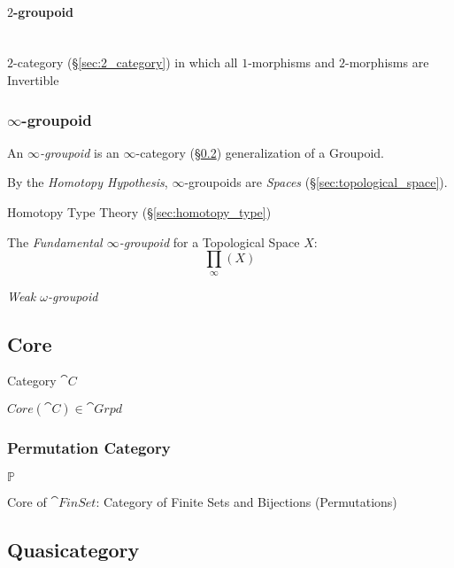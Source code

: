 \paragraph{$2$-groupoid}\label{sec:2_groupoid}
\hfill \\

$2$-category (\S\ref{sec:2_category}) in which all $1$-morphisms and
$2$-morphisms are Invertible



\subsubsection{$\infty$-groupoid}\label{sec:infinity_groupoid}

An \emph{$\infty$-groupoid} is an $\infty$-category
(\S\ref{sec:quasicategory}) generalization of a Groupoid.

By the \emph{Homotopy Hypothesis}, $\infty$-groupoids are \emph{Spaces}
(\S\ref{sec:topological_space}).

Homotopy Type Theory (\S\ref{sec:homotopy_type})

The \emph{Fundamental $\infty$-groupoid} for a Topological Space $X$:
\[
  \prod_\infty(X)
\]

\emph{Weak $\omega$-groupoid}



\subsection{Core}\label{sec:core}

Category $\cat{C}$

$Core(\cat{C}) \in \cat{Grpd}$



\subsubsection{Permutation Category}\label{sec:permutation_category}

$\mathbb{P}$

Core of $\cat{FinSet}$: Category of Finite Sets and Bijections
(Permutations)



\subsection{Quasicategory}\label{sec:quasicategory}

